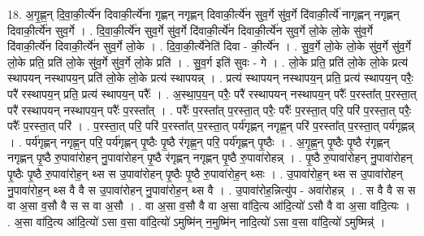 \documentclass[17pt]{extarticle}
\begin{document}
18. अ॒गृ॒ह्ण॒न् दि॒वा॒की॒र्त्ये॑न दिवाकी॒र्त्ये॑ना गृह्णन् नगृह्णन् दिवाकी॒र्त्ये॑न सुव॒र्गे सु॑व॒र्गे दि॑वाकी॒र्त्ये॑ नागृह्णन् नगृह्णन् दिवाकी॒र्त्ये॑न सुव॒र्गे । . दि॒वा॒की॒र्त्ये॑न सुव॒र्गे सु॑व॒र्गे दि॑वाकी॒र्त्ये॑न दिवाकी॒र्त्ये॑न सुव॒र्गे लो॒के लो॒के सु॑व॒र्गे दि॑वाकी॒र्त्ये॑न दिवाकी॒र्त्ये॑न सुव॒र्गे लो॒के । . दि॒वा॒की॒र्त्ये॑नेति॑ दिवा - की॒र्त्ये॑न । . सु॒व॒र्गे लो॒के लो॒के सु॑व॒र्गे सु॑व॒र्गे लो॒के प्रति॒ प्रति॑ लो॒के सु॑व॒र्गे सु॑व॒र्गे लो॒के प्रति॑ । . सु॒व॒र्ग इति॑ सुवः - गे । . लो॒के प्रति॒ प्रति॑ लो॒के लो॒के प्रत्य॑ स्थापयन् नस्थापय॒न् प्रति॑ लो॒के लो॒के प्रत्य॑ स्थापयन्न् । . प्रत्य॑ स्थापयन् नस्थापय॒न् प्रति॒ प्रत्य॑ स्थापय॒न् परैः॒ परै॑ रस्थापय॒न् प्रति॒ प्रत्य॑ स्थापय॒न् परैः᳚ । . अ॒स्था॒प॒य॒न् परैः॒ परै॑ रस्थापयन् नस्थापय॒न् परैः᳚ प॒रस्ता᳚त् प॒रस्ता॒त् परै॑ रस्थापयन् नस्थापय॒न् परैः᳚ प॒रस्ता᳚त् । . परैः᳚ प॒रस्ता᳚त् प॒रस्ता॒त् परैः॒ परैः᳚ प॒रस्ता॒त् परि॒ परि॑ प॒रस्ता॒त् परैः॒ परैः᳚ प॒रस्ता॒त् परि॑ । . प॒रस्ता॒त् परि॒ परि॑ प॒रस्ता᳚त् प॒रस्ता॒त् पर्य॑गृह्णन् नगृह्ण॒न् परि॑ प॒रस्ता᳚त् प॒रस्ता॒त् पर्य॑गृह्णन्न् । . पर्य॑गृह्णन् नगृह्ण॒न् परि॒ पर्य॑गृह्णन् पृ॒ष्ठैः पृ॒ष्ठै र॑गृह्ण॒न् परि॒ पर्य॑गृह्णन् पृ॒ष्ठैः । . अ॒गृ॒ह्ण॒न् पृ॒ष्ठैः पृ॒ष्ठै र॑गृह्णन् नगृह्णन् पृ॒ष्ठै रु॒पावा॑रोहन् नु॒पावा॑रोहन् पृ॒ष्ठै र॑गृह्णन् नगृह्णन् पृ॒ष्ठै रु॒पावा॑रोहन्न् । . पृ॒ष्ठै रु॒पावा॑रोहन् नु॒पावा॑रोहन् पृ॒ष्ठैः पृ॒ष्ठै रु॒पावा॑रोह॒न् थ्स स उ॒पावा॑रोहन् पृ॒ष्ठैः पृ॒ष्ठै रु॒पावा॑रोह॒न् थ्सः । . उ॒पावा॑रोह॒न् थ्स स उ॒पावा॑रोहन् नु॒पावा॑रोह॒न् थ्स वै वै स उ॒पावा॑रोहन् नु॒पावा॑रोह॒न् थ्स वै । . उ॒पावा॑रोह॒न्नित्यु॑प - अवा॑रोहन्न् । . स वै वै स स वा अ॒सा व॒सौ वै स स वा अ॒सौ । . वा अ॒सा व॒सौ वै वा अ॒सा वा॑दि॒त्य आ॑दि॒त्यो॑ ऽसौ वै वा अ॒सा वा॑दि॒त्यः । . अ॒सा वा॑दि॒त्य आ॑दि॒त्यो॑ ऽसा व॒सा वा॑दि॒त्यो॑ ऽमुष्मि॑न् न॒मुष्मि॑न् नादि॒त्यो॑ ऽसा व॒सा वा॑दि॒त्यो॑ ऽमुष्मिन्न्॑ । \newline
\end{document}
